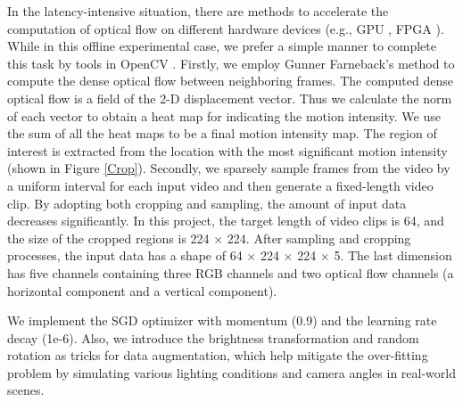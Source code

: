 \documentclass[a4paper,conference]{IEEEtran}
\begin{document}
In the latency-intensive situation, there are methods to accelerate the computation of optical flow on different hardware devices (e.g., GPU \cite{gpu_based_opt_2}, FPGA \cite{gpu_based_opt_1}). While in this offline experimental case, we prefer a simple manner to complete this task by tools in OpenCV \cite{opencv}. Firstly, we employ Gunner Farneback's method \cite{optflow} to compute the dense optical flow between neighboring frames. The computed dense optical flow is a field of the 2-D displacement vector. Thus we calculate the norm of each vector to obtain a heat map for indicating the motion intensity. We use the sum of all the heat maps to be a final motion intensity map. The region of interest is extracted from the location with the most significant motion intensity (shown in Figure \ref{Crop}). Secondly, we sparsely sample frames from the video by a uniform interval for each input video and then generate a fixed-length video clip. By adopting both cropping and sampling, the amount of input data decreases significantly. In this project, the target length of video clips is 64, and the size of the cropped regions is 224 $\times$ 224. After sampling and cropping processes, the input data has a shape of 64 $\times$ 224 $\times$ 224 $\times$ 5. The last dimension has five channels containing three RGB channels and two optical flow channels (a horizontal component and a vertical component).

We implement the SGD optimizer with momentum (0.9) and the learning rate decay (1e-6). Also, we introduce the brightness transformation and random rotation as tricks for data augmentation, which help mitigate the over-fitting problem by simulating various lighting conditions and camera angles in real-world scenes. 
\end{document}
